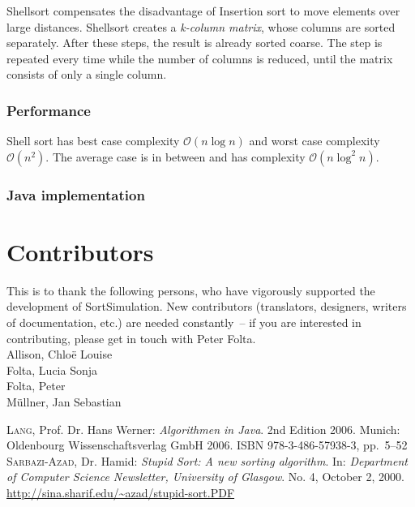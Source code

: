 \documentclass[nobranding]{pfBook}
\newcommand{\OO}{\mathcal{O}}
\begin{document}
	Shellsort compensates the disadvantage of Insertion sort to move elements over large distances. Shellsort creates a \emph{k-column matrix}, whose columns are sorted separately. After these steps, the result is already sorted coarse. The step is repeated every time while the number of columns is reduced, until the matrix consists of only a single column.
	
	\subsubsection{Performance}
	
	Shell sort has best case complexity $\OO(n \log n)$ and worst case complexity $\OO(n^2)$. The average case is in between and has complexity $\OO(n \log^2 n)$.
	
	\subsubsection{Java implementation}
	
	
	
	\section{Contributors}
	
	This is to thank the following persons, who have vigorously supported the development of SortSimulation. New contributors (translators, designers, writers of documentation, etc.) are needed constantly~-- if you are interested in contributing, please get in touch with Peter Folta.\\
	[\baselineskip]
	Allison, Chloë Louise\\
	Folta, Lucia Sonja\\
	Folta, Peter\\
	Müllner, Jan Sebastian
	
	\begin{thebibliography}{99}
			\textsc{Lang}, Prof. Dr. Hans Werner: \emph{Algorithmen in Java}. 2nd Edition 2006. Munich: Oldenbourg Wissenschaftsverlag GmbH 2006. ISBN 978-3-486-57938-3, pp.~5--52
			\textsc{Sarbazi-Azad}, Dr. Hamid: \emph{Stupid Sort: A new sorting algorithm}. In: \emph{Department of Computer Science Newsletter, University of Glasgow}. No. 4, October 2, 2000. \href{http://sina.sharif.edu/~azad/stupid-sort.PDF}{http://sina.sharif.edu/\~{}azad/stupid-sort.PDF}
	\end{thebibliography}
	
	\makelistoffigures
	\makelistoflistings
\end{document}
